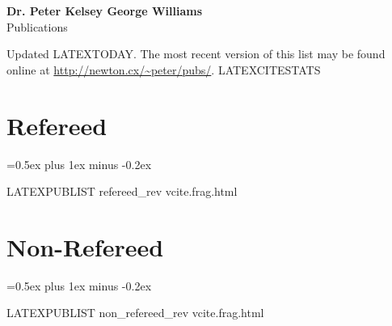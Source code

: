 \documentclass[letterpaper,11pt]{article}
\newenvironment{publist}{
  \begingroup
  \raggedright
  \parskip=0.5ex plus 1ex minus -0.2ex
}{
  \endgroup
}
\begin{document}
\pagestyle{fancy}
\lhead{} \chead{} \rhead{} \renewcommand{\headrule}{\relax}
\cfoot{\thepage/\pageref*{LastPage}}

\begin{center}
\textbf{\Large Dr. Peter Kelsey George Williams} \\
{\large Publications}
\end{center}

\noindent Updated
LATEXTODAY.
The most recent version of this list may be found online at
\url{http://newton.cx/~peter/pubs/}.
LATEXCITESTATS

\section*{Refereed}

\begin{publist}
LATEXPUBLIST refereed_rev vcite.frag.html
\end{publist}

\section*{Non-Refereed}

\begin{publist}
LATEXPUBLIST non_refereed_rev vcite.frag.html
\end{publist}
\end{document}
